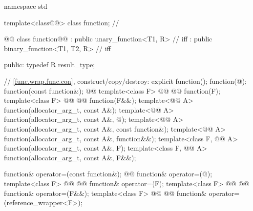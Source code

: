 \documentclass[american,twoside]{book}
\begin{document}
\begin{codeblock}
namespace std {
  template<class@@> class function; // 

  @@
  class function@@ 
    : public unary_function<T1, R>      // iff 
    : public binary_function<T1, T2, R> // iff 
  {
  public:
    typedef R result_type;

    // \ref{func.wrap.func.con}, construct/copy/destroy:
    explicit function();
    function(@\unspecnull@);
    function(const function&);
    @@
    template<class F> 
      @@
               @@
      function(F);
    template<class F> 
      @@ 
               @@
      function(F&&);
    template<@@ A> 
      function(allocator_arg_t, const A&);
    template<@@ A> function(allocator_arg_t, const A&,
      @\unspecnull@);
    template<@@ A> function(allocator_arg_t, const A&,
      const function&);
    template<@@ A> function(allocator_arg_t, const A&,
      function&&);
    template<class F, @@ A> function(allocator_arg_t, const A&, F);
    template<class F, @@ A> function(allocator_arg_t, const A&, F&&);

    function& operator=(const function&);
    @@
    function& operator=(@\unspecnull@);
    template<class F> 
      @@ 
               @@
      function& operator=(F);
    template<class F> 
      @@ 
               @@
      function& operator=(F&&);
    template<class F> 
      @@ 
               @@
      function& operator=(reference_wrapper<F>);

}}
\end{codeblock}
\end{document}
